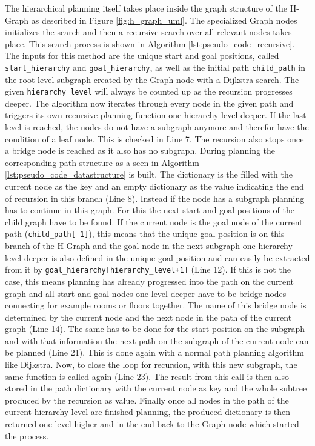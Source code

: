 The hierarchical planning itself takes place inside the graph structure of the H-Graph as described in Figure \ref{fig:h_graph_uml}. The specialized Graph nodes initializes the search and then a recursive search over all relevant nodes takes place. This search process is shown in Algorithm \ref{lst:pseudo_code_recursive}. The inputs for this method are the unique start and goal positions, called \texttt{start\_hierarchy} and \texttt{goal\_hierarchy}, as well as the initial path \texttt{child\_path} in the root level subgraph created by the Graph node with a Dijkstra search. The given \texttt{hierarchy\_level} will always be counted up as the recursion progresses deeper. The algorithm now iterates through every node in the given path and triggers its own recursive planning function one hierarchy level deeper. If the last level is reached, the nodes do not have a subgraph anymore and therefor have the condition of a leaf node. This is checked in Line 7. The recursion also stops once a bridge node is reached as it also has no subgraph. During planning the corresponding path structure as a seen in Algorithm \ref{lst:pseudo_code_datastructure} is built. The dictionary is the filled with the current node as the key and an empty dictionary as the value indicating the end of recursion in this branch (Line 8). Instead if the node has a subgraph planning has to continue in this graph. For this the next start and goal positions of the child graph have to be found. If the current node is the goal node of the current path (\texttt{child\_path[-1]}), this means that the unique goal position is on this branch of the H-Graph and the goal node in the next subgraph one hierarchy level deeper is also defined in the unique goal position and can easily be extracted from it by \texttt{goal\_hierarchy[hierarchy\_level+1]} (Line 12). If this is not the case, this means planning has already progressed into the path on the current graph and all start and goal nodes one level deeper have to be bridge nodes connecting for example rooms or floors together. The name of this bridge node is determined by the current node and the next node in the path of the current graph (Line 14). The same has to be done for the start position on the subgraph and with that information the next path on the subgraph of the current node can be planned (Line 21). This is done again with a normal path planning algorithm like Dijkstra. Now, to close the loop for recursion, with this new subgraph, the same function is called again (Line 23). The result from this call is then also stored in the path dictionary with the current node as key and the whole subtree produced by the recursion as value. Finally once all nodes in the path of the current hierarchy level are finished planning, the produced dictionary is then returned one level higher and in the end back to the Graph node which started the process. 

